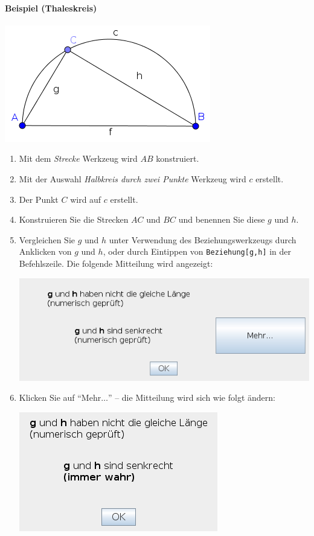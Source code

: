 \documentclass{article}
\begin{document}
\paragraph{Beispiel (Thaleskreis)}
\begin{center}
\includegraphics[scale=0.5]{Relation-example}
\end{center}
\begin{enumerate}
    \item Mit dem \textit{Strecke} Werkzeug wird $AB$ konstruiert.
    \item Mit der Auswahl \textit{Halbkreis durch zwei Punkte} Werkzeug wird $c$ erstellt.
    \item Der Punkt $C$ wird auf $c$ erstellt.
    \item Konstruieren Sie die Strecken $AC$ und $BC$ und benennen Sie diese $g$ und $h$.
    \item Vergleichen Sie $g$ und $h$ unter Verwendung des Beziehungswerkzeugs durch Anklicken von $g$ und $h$, oder durch Eintippen von \texttt{Beziehung[g,h]} in der Befehlszeile. Die folgende Mitteilung wird angezeigt:
    \begin{center}
    \includegraphics[scale=0.5]{Relation-example-Relation1-de}
    \end{center}
    \item Klicken Sie auf ``Mehr$\ldots$'' -- die Mitteilung wird sich wie folgt ändern:
    \begin{center}
    \includegraphics[scale=0.5]{Relation-example-Relation2-de}
    \end{center}
    
\end{enumerate}
\end{document}
